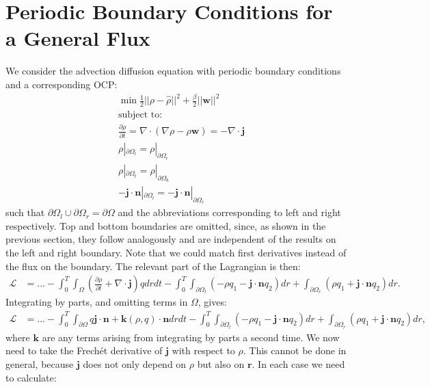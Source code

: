 \documentclass[11pt, a4paper]{article}
\theoremstyle{definition}
\newcommand{\w}{\mathbf{w}}
\newcommand{\n}{\mathbf{n}}
\newcommand{\hr}{\widehat \rho}
\newcommand{\jf}{\mathbf j}
\begin{document}
	
		
	\section{Periodic Boundary Conditions for a General Flux}
	
	We consider the advection diffusion equation with periodic boundary conditions and a corresponding OCP:
	\begin{align*}
		&\min \frac{1}{2}|| \rho - \hr||^2 + \frac{\beta}{2}||\w||^2\\
		&\text{subject to:}\\
		&\frac{\partial \rho}{\partial t} = \nabla \cdot \left(\nabla \rho - \rho \w\right) = -\nabla \cdot \jf\\
		& \rho|_{\partial \Omega_l} = \rho|_{\partial \Omega_r}\\
		& \rho|_{\partial \Omega_t} = \rho|_{\partial \Omega_b}\\
		& - \jf \cdot \n |_{\partial \Omega_l}= - \jf \cdot \n|_{\partial \Omega_r}
	\end{align*}
	such that $\partial\Omega_l \cup \partial\Omega_r = \partial \Omega$ and the abbreviations corresponding to left and right respectively. Top and bottom boundaries are omitted, since, as shown in the previous section, they follow analogously and are independent of the results on the left and right boundary. Note that we could match first derivatives instead of the flux on the boundary.
	The relevant part of the Lagrangian is then:
	\begin{align*}
		\mathcal{L} &= ... -\int_0^T \int_\Omega \left(\frac{\partial \rho}{\partial t} + \nabla \cdot \jf\right)q dr dt - \int_0^T \int_{\partial \Omega_l} \left(- \rho q_1 - \jf \cdot \n q_2 \right) dr  + \int_{\partial \Omega_r} \left(\rho q_1 +  \jf \cdot \n q_2  \right)  dr .
	\end{align*}
	Integrating by parts, and omitting terms in $\Omega$, gives:
	\begin{align*}
		\mathcal{L} &= ... - \int_0^T \int_{\partial \Omega} q \jf  \cdot \n + \mathbf{k}(\rho, q) \cdot \n  dr dt - \int_0^T \int_{\partial \Omega_l} \left(- \rho q_1 - \jf \cdot \n q_2 \right)   dr  + \int_{\partial \Omega_r} \left(\rho q_1 + \jf \cdot \n q_2 \right)   dr, 
	\end{align*}
	where $\mathbf{k}$ are any terms arising from integrating by parts a second time.
	We now need to take the Frech\'et derivative of $\jf$ with respect to $\rho$. This cannot be done in general, because $\jf$ does not only depend on $\rho$ but also on $\mathbf r$. In each case we need to calculate:
\end{document}
